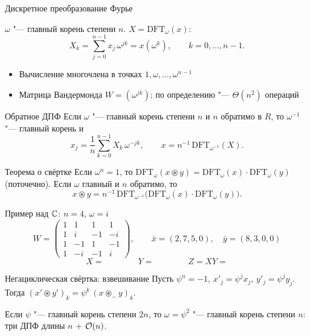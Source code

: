 \documentclass{ca-slides}
\begin{document}
\begin{canvasframe}{Дискретное преобразование Фурье}
  \begin{definition}
    $\omega$ "--- главный корень степени $n$. $X = \mathrm{DFT}_\omega(x)$:
    \[ X_k = \sum_{j=0}^{n-1} x_j\, \omega^{jk} = x(\omega^k), \qquad k = 0, \dots, n-1. \]
  \end{definition}
  \begin{itemize}
    \item Вычисление многочлена в точках $1, \omega, \dots, \omega^{n-1}$
    \item Матрица Вандермонда $W = (\omega^{jk})$; по определению "--- $\Theta(n^2)$ операций
  \end{itemize}
  \penspace[0.1\textheight]
\end{canvasframe}

\begin{theoremframe}{Обратное ДПФ}
  Если $\omega$ "--- главный корень степени $n$ и $n$ обратимо в $R$, то $\omega^{-1}$ "---
  главный корень и
  \[ x_j = \frac1n \sum_{k=0}^{n-1} X_k\, \omega^{-jk}, \qquad x = n^{-1}\,\mathrm{DFT}_{\omega^{-1}}(X). \]
\end{theoremframe}

\begin{theoremframe}{Теорема о свёртке}
  Если $\omega^n = 1$, то $\mathrm{DFT}_\omega(x \circledast y) = \mathrm{DFT}_\omega(x) \cdot
  \mathrm{DFT}_\omega(y)$ (поточечно). Если $\omega$ главный и $n$ обратимо, то
  \[ x \circledast y = n^{-1}\,\mathrm{DFT}_{\omega^{-1}}\bigl(\mathrm{DFT}_\omega(x) \cdot
     \mathrm{DFT}_\omega(y)\bigr). \]
\end{theoremframe}

\begin{canvasframe}{Пример над $\mathbb{C}$: $n = 4$, $\omega = i$}
  \[
    W = \begin{pmatrix} 1 & 1 & 1 & 1\\ 1 & i & -1 & -i\\ 1 & -1 & 1 & -1\\ 1 & -i & -1 & i \end{pmatrix},
    \qquad \bar x = (2, 7, 5, 0), \quad \bar y = (8, 3, 0, 0)
  \]
  \[ X = \qquad\qquad Y = \qquad\qquad Z = XY = \]
  \notearea[0.3\textheight]
\end{canvasframe}

\begin{theoremframe}[proposition]{Негациклическая свёртка: взвешивание}
  Пусть $\psi^n = -1$, $x'_j = \psi^j x_j$, $y'_j = \psi^j y_j$. Тогда
  $(x' \circledast y')_k = \psi^k\, (x \circledast_{-} y)_k$.
  \par\smallskip\textcolor{caGray}{\small Если $\psi$ "--- главный корень степени $2n$, то
  $\omega = \psi^2$ "--- главный корень степени $n$: три ДПФ длины $n$ + $\mathcal{O}(n)$.}
\end{theoremframe}
\end{document}
